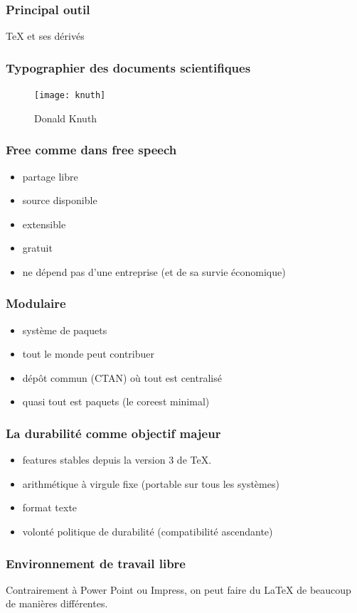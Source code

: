 \documentclass{beamer}
\begin{document}
\begin{frame}
  \frametitle{Principal outil}
  \TeX{} et ses dérivés
\end{frame}

\begin{frame}
  \frametitle{Typographier des documents scientifiques}
  \begin{figure}[H]
    \centering
    \texttt{[image: knuth]}
    \caption{Donald Knuth}
    \label{fig:knuth}
  \end{figure}
\end{frame}

\begin{frame}
  \frametitle{Free comme dans \og free speech\fg}
  \begin{itemize}
  \item partage libre
  \item source disponible
  \item extensible
  \item gratuit
  \item ne dépend pas d'une entreprise (et de sa survie économique)
  \end{itemize}
\end{frame}

\begin{frame}
  \frametitle{Modulaire}
  \begin{itemize}
  \item système de paquets
  \item tout le monde peut contribuer
  \item dép\^ot commun (CTAN) où tout est centralisé
  \item quasi tout est paquets (le \og core\fg est minimal)
  \end{itemize}
\end{frame}

\begin{frame}
  \frametitle{La durabilité comme objectif majeur}
  \begin{itemize}
  \item features stables depuis la version 3 de \TeX.
  \item arithmétique à virgule fixe (portable sur tous les systèmes)
  \item format texte
  \item volonté politique de durabilité (compatibilité ascendante)
  \end{itemize}
\end{frame}

\begin{frame}
  \frametitle{Environnement de travail libre}
  Contrairement à Power Point ou Impress, on peut faire du \LaTeX{} de
  beaucoup de manières différentes.
\end{frame}
\end{document}
